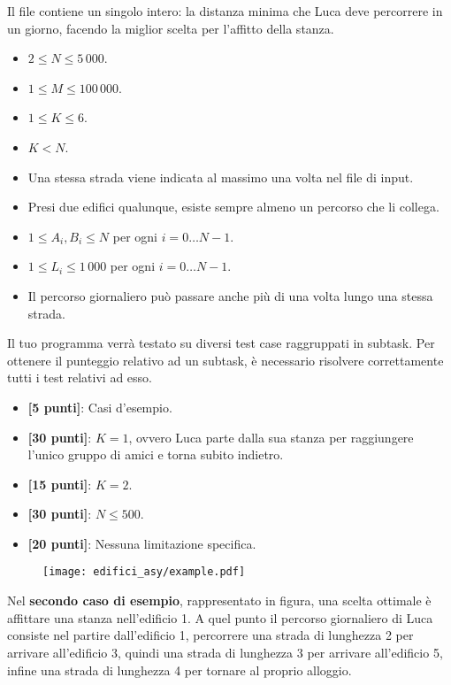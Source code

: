 \Output
Il file \outputfile{} contiene un singolo intero: la distanza minima che Luca deve percorrere in un giorno, facendo la miglior scelta per l'affitto della stanza.

\Constraints
\begin{itemize}[nolistsep, itemsep=2mm]
\item $2 \le N \le 5\,000$.
\item $1 \le M \le 100\,000$.
\item $1 \le K \le 6$.
\item $K < N$.
\item Una stessa strada viene indicata al massimo una volta nel file di input.
\item Presi due edifici qualunque, esiste sempre almeno un percorso che li collega.
\item $1 \le A_i, B_i \le N$ per ogni $i=0 \ldots N-1$.
\item $1 \le L_i \le 1\,000$ per ogni $i=0 \ldots N-1$.
\item Il percorso giornaliero può passare anche più di una volta lungo una stessa strada.
\end{itemize}

\Scoring
Il tuo programma verrà testato su diversi test case raggruppati in subtask.
Per ottenere il punteggio relativo ad un subtask, è necessario risolvere
correttamente tutti i test relativi ad esso.
\begin{itemize}[nolistsep,itemsep=2mm]
\item \textbf{ [5 punti]}: Casi d'esempio.
\item \textbf{ [30 punti]}: $K = 1$, ovvero Luca parte dalla sua stanza per raggiungere l'unico gruppo di amici e torna subito indietro.
\item \textbf{ [15 punti]}: $K = 2$.
\item \textbf{ [30 punti]}: $N \le 500$.
\item \textbf{ [20 punti]}: Nessuna limitazione specifica.
\end{itemize}

\Examples
\begin{example}
%
%
\end{example}

\Explanation

\begin{figure}[h!]
    \centering
    \texttt{[image: edifici\_asy/example.pdf]}
\end{figure}


Nel \textbf{secondo caso di esempio}, rappresentato in figura, una scelta ottimale è affittare una stanza nell'edificio 1. A quel punto il percorso giornaliero di Luca consiste nel partire dall'edificio 1, percorrere una strada di lunghezza 2 per arrivare all'edificio 3, quindi una strada di lunghezza 3 per arrivare all'edificio 5, infine una strada di lunghezza 4 per tornare al proprio alloggio.
